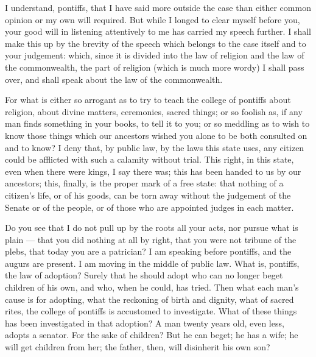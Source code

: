  I understand, pontiffs, that I have said more outside the case than either common opinion or my own will required. But while I longed to clear myself before you, your good will in listening attentively to me has carried my speech further. I shall make this up by the brevity of the speech which belongs to the case itself and to your judgement: which, since it is divided into the law of religion and the law of the commonwealth, the part of religion (which is much more wordy) I shall pass over, and shall speak about the law of the commonwealth.

 For what is either so arrogant as to try to teach the college of pontiffs about religion, about divine matters, ceremonies, sacred things; or so foolish as, if any man finds something in your books, to tell it to you; or so meddling as to wish to know those things which our ancestors wished you alone to be both consulted on and to know? I deny that, by public law, by the laws this state uses, any citizen could be afflicted with such a calamity without trial. This right, in this state, even when there were kings, I say there was; this has been handed to us by our ancestors; this, finally, is the proper mark of a free state: that nothing of a citizen's life, or of his goods, can be torn away without the judgement of the Senate or of the people, or of those who are appointed judges in each matter.

 Do you see that I do not pull up by the roots all your acts, nor pursue what is plain --- that you did nothing at all by right, that you were not tribune of the plebs, that today you are a patrician? I am speaking before pontiffs, and the augurs are present. I am moving in the middle of public law. What is, pontiffs, the law of adoption? Surely that he should adopt who can no longer beget children of his own, and who, when he could, has tried. Then what each man's cause is for adopting, what the reckoning of birth and dignity, what of sacred rites, the college of pontiffs is accustomed to investigate. What of these things has been investigated in that adoption? A man twenty years old, even less, adopts a senator. For the sake of children? But he can beget; he has a wife; he will get children from her; the father, then, will disinherit his own son?

